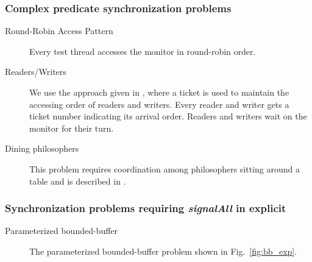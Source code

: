 \documentclass{sigplanconf}
\begin{document}
\subsubsection{Complex predicate synchronization problems}
\begin{description}
    \item[Round-Robin Access Pattern] Every test thread accesses the
        monitor in round-robin order. 
    \item[Readers/Writers  \cite{chp71}] 
    We use the approach given in \cite{bh05}, where a ticket is used
        to maintain the accessing order of readers and writers. Every reader
        and writer gets a ticket number indicating its arrival order. Readers
        and writers wait on the monitor for their turn. 
    \item [Dining philosophers \cite{dijk71}] This problem requires
        coordination among philosophers sitting around a table and is described
        in \cite{dijk71}.
\end{description}
\subsubsection{Synchronization problems requiring {\em signalAll} in explicit }
\begin{description}
    \item[Parameterized bounded-buffer   \cite{dijk65, dijk71}] The 
        parameterized bounded-buffer problem shown in Fig.~\ref{fig:bb_exp}. 
\end{description}
\end{document}
